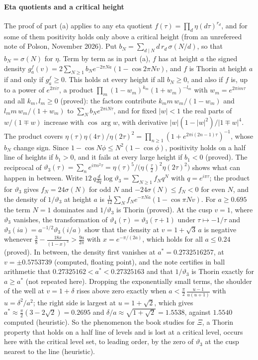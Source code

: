 \paragraph{Eta quotients and a critical height} The proof of part (a) applies to any eta quotient $f(\tau)=\prod_d\eta(d\tau)^{r_d}$, and for some of them positivity holds only above a critical height (from an unrefereed note of Polson, November 2026). Put $b_N=\sum_{d\mid N}d\,r_d\,\sigma(N/d)$, so that $b_N=\sigma(N)$ for $\eta$. Term by term as in part (a), $f$ has at height $a$ the signed density $g^f_a(v)=2\sum_{N\ge1}b_Ne^{-2\pi Na}(1-\cos2\pi Nv)$, and $f$ is Thorin at height $a$ if and only if $g^f_a\ge0$. This holds at every height if all $b_N\ge0$, and also if $f$ is, up to a power of $e^{2\pi i\tau}$, a product $\prod_m(1-w_m)^{k_m}(1+w_m)^{-l_m}$ with $w_m=e^{2\pi im\tau}$ and all $k_m,l_m\ge0$ (proved): the factors contribute $k_mm\,w_m/(1-w_m)$ and $l_mm\,w_m/(1+w_m)$ to $\sum_Nb_Ne^{2\pi iN\tau}$, and for fixed $|w|<1$ the real parts of $w/(1\mp w)$ increase with $\cos\arg w$, with derivative $|w|(1-|w|^2)/|1\mp w|^4$. The product covers $\eta(\tau)\eta(4\tau)/\eta(2\tau)^2=\prod_{n\ge1}(1+e^{2\pi i(2n-1)\tau})^{-1}$, whose $b_N$ change sign. Since $1-\cos N\phi\le N^2(1-\cos\phi)$, positivity holds on a half line of heights if $b_1>0$, and it fails at every large height if $b_1<0$ (proved). The reciprocal of $\vartheta_3(\tau)=\sum_ne^{i\pi n^2\tau}=\eta(\tau)^5/\bigl(\eta(\frac\tau2)^2\eta(2\tau)^2\bigr)$ shows what can happen in between. Write $12\,q\frac{d}{dq}\log\vartheta_3=\sum_{N\ge1}f_Nq^N$ with $q=e^{i\pi\tau}$; the product for $\vartheta_3$ gives $f_N=24\sigma(N)$ for odd $N$ and $-24\sigma(N)\le f_N<0$ for even $N$, and the density of $1/\vartheta_3$ at height $a$ is $\frac1{12}\sum_Nf_Ne^{-\pi Na}(1-\cos\pi Nv)$. For $a\ge0.695$ the term $N=1$ dominates and $1/\vartheta_3$ is Thorin (proved). At the cusp $v=1$, where $\vartheta_3$ vanishes, the transformation of $\vartheta_4(\tau)=\vartheta_3(\tau+1)$ under $\tau\mapsto-1/\tau$ and $\vartheta_3(ia)=a^{-1/2}\vartheta_3(i/a)$ show that the density at $v=1+\sqrt3\,a$ is negative whenever $\frac38-\frac{18x}{(1-x)^3}>\frac{9a}{2\pi}$ with $x=e^{-\pi/(2a)}$, which holds for all $a\le0.24$ (proved). In between, the density first vanishes at $a^*=0.2732516257$, at $v=\pm0.5753739$ (computed, floating point), and the note certifies in ball arithmetic that $0.27325162<a^*<0.27325163$ and that $1/\vartheta_3$ is Thorin exactly for $a\ge a^*$ (not repeated here). Dropping the exponentially small terms, the shoulder of the well at $v=1+\delta$ rises above zero exactly when $a<\frac\pi2\,\frac{u-1}{u(u+1)}$ with $u=\delta^2/a^2$; the right side is largest at $u=1+\sqrt2$, which gives $a^*\approx\frac\pi2(3-2\sqrt2)=0.2695$ and $\delta/a\approx\sqrt{1+\sqrt2}=1.5538$, against $1.5540$ computed (heuristic). So the phenomenon the book studies for $\Xi$, a Thorin property that holds on a half line of levels and is lost at a critical level, occurs here with the critical level set, to leading order, by the zero of $\vartheta_3$ at the cusp nearest to the line (heuristic).


